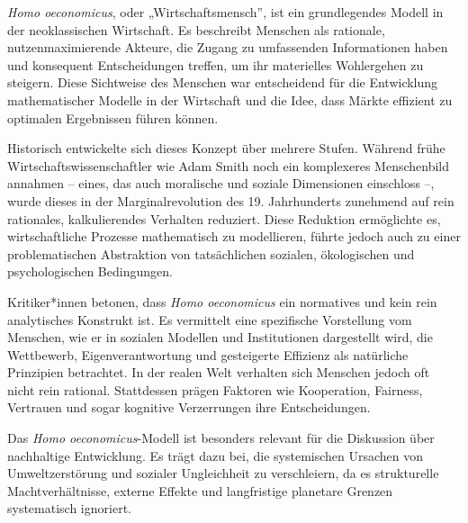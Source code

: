 \documentclass[
  nswissgerman,
  a4paper,
  openany]{book}
\begin{document}
\begin{tcolorbox}[enhanced jigsaw, arc=.35mm, bottomrule=.15mm, bottomtitle=1mm, breakable, colback=white, colbacktitle=quarto-callout-note-color!10!white, colframe=quarto-callout-note-color-frame, coltitle=black, left=2mm, leftrule=.75mm, opacityback=0, opacitybacktitle=0.6, rightrule=.15mm, title={Homo oeconomicus als grundlegendes Modell menschlichen Verhaltens}, titlerule=0mm, toprule=.15mm, toptitle=1mm]

\emph{Homo oeconomicus}, oder „Wirtschaftsmensch'', ist ein
grundlegendes Modell in der neoklassischen Wirtschaft. Es beschreibt
Menschen als rationale, nutzenmaximierende Akteure, die Zugang zu
umfassenden Informationen haben und konsequent Entscheidungen treffen,
um ihr materielles Wohlergehen zu steigern. Diese Sichtweise des
Menschen war entscheidend für die Entwicklung mathematischer Modelle in
der Wirtschaft und die Idee, dass Märkte effizient zu optimalen
Ergebnissen führen können.

Historisch entwickelte sich dieses Konzept über mehrere Stufen. Während
frühe Wirtschaftswissenschaftler wie Adam Smith noch ein komplexeres
Menschenbild annahmen -- eines, das auch moralische und soziale
Dimensionen einschloss --, wurde dieses in der Marginalrevolution des
19. Jahrhunderts zunehmend auf rein rationales, kalkulierendes Verhalten
reduziert. Diese Reduktion ermöglichte es, wirtschaftliche Prozesse
mathematisch zu modellieren, führte jedoch auch zu einer problematischen
Abstraktion von tatsächlichen sozialen, ökologischen und psychologischen
Bedingungen.

Kritiker*innen betonen, dass \emph{Homo oeconomicus} ein normatives und
kein rein analytisches Konstrukt ist. Es vermittelt eine spezifische
Vorstellung vom Menschen, wie er in sozialen Modellen und Institutionen
dargestellt wird, die Wettbewerb, Eigenverantwortung und gesteigerte
Effizienz als natürliche Prinzipien betrachtet. In der realen Welt
verhalten sich Menschen jedoch oft nicht rein rational. Stattdessen
prägen Faktoren wie Kooperation, Fairness, Vertrauen und sogar kognitive
Verzerrungen ihre Entscheidungen.

Das \emph{Homo oeconomicus}-Modell ist besonders relevant für die
Diskussion über nachhaltige Entwicklung. Es trägt dazu bei, die
systemischen Ursachen von Umweltzerstörung und sozialer Ungleichheit zu
verschleiern, da es strukturelle Machtverhältnisse, externe Effekte und
langfristige planetare Grenzen systematisch ignoriert.

\end{tcolorbox}
\end{document}
